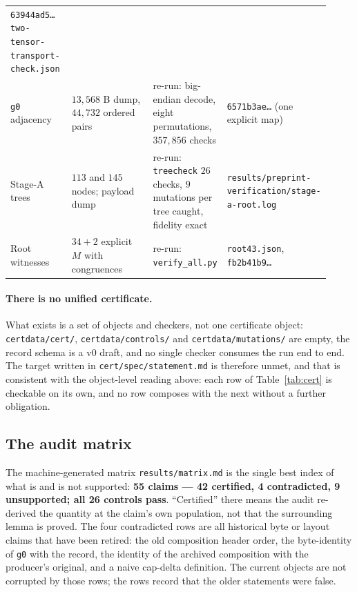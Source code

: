 \documentclass[10pt]{article}
\theoremstyle{definition}
\newcommand{\file}[1]{\texttt{\small #1}}
\begin{document}
\begin{center}
\begin{longtable}{@{}L{0.20\linewidth}L{0.34\linewidth}L{0.16\linewidth}L{0.22\linewidth}@{}}
\texttt{63944ad5\ldots} \file{two-\allowbreak{}tensor-\allowbreak{}transport-\allowbreak{}check.json} \\
\texttt{g0} adjacency & $13{,}568$ B dump, $44{,}732$ ordered pairs & re-run: big-endian decode, eight
permutations, $357{,}856$ checks & \texttt{6571b3ae\ldots} (one explicit map) \\
Stage-A trees & $113$ and $145$ nodes; payload dump & re-run: \file{treecheck} $26$ checks, $9$
mutations per tree caught, fidelity exact & \file{results/\allowbreak{}preprint-\allowbreak{}verification/\allowbreak{}stage-\allowbreak{}a-\allowbreak{}root.log} \\
Root witnesses & $34+2$ explicit $M$ with congruences & re-run: \file{verify\_all.py} &
\file{root43.json}, \texttt{fb2b41b9\ldots} \\
\bottomrule
\end{longtable}
\end{center}

\paragraph{There is no unified certificate.} What exists is a set of objects and checkers, not one
certificate object: \file{certdata/cert/}, \file{certdata/controls/} and \file{certdata/mutations/} are
empty, the record schema is a v0 draft, and no single checker consumes the run end to end. The target
written in \file{cert/spec/statement.md} is therefore unmet, and that is consistent with the object-level
reading above: each row of Table~\ref{tab:cert} is checkable on its own, and no row composes with the
next without a further obligation.

\subsection{The audit matrix}\label{sec:matrix}
The machine-generated matrix \file{results/\allowbreak{}matrix.md} is the single best index of what is and is not
supported: \textbf{55 claims --- 42 certified, 4 contradicted, 9 unsupported; all 26 controls pass}.
``Certified'' there means the audit re-derived the quantity at the claim's own population, not that the
surrounding lemma is proved. The four contradicted rows are all historical byte or layout claims that
have been retired: the old composition header order, the byte-identity of \texttt{g0} with the record,
the identity of the archived composition with the producer's original, and a naive cap-delta
definition. The current objects are not corrupted by those rows; the rows record that the older
statements were false.
\end{document}
